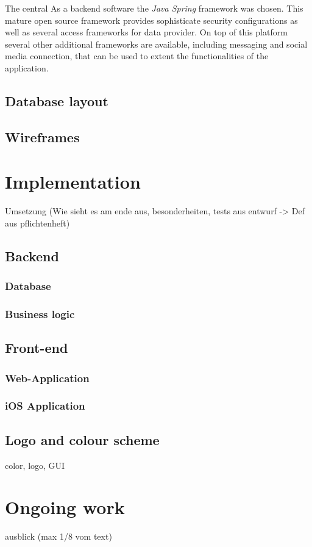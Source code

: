 The central As a backend software the \emph{Java Spring} framework was chosen. This mature open source framework provides sophisticate security configurations as well as several access frameworks for data provider. On top of this platform several other additional frameworks are available, including messaging and social media connection, that can be used to extent the functionalities of the application.



\section{Database layout}

\section{Wireframes}
\label{sec:Wireframes}

\chapter{Implementation}
Umsetzung (Wie sieht es am ende aus, besonderheiten, tests aus entwurf -> Def aus pflichtenheft)

\section{Backend}
\subsection{Database}
\subsection{Business logic}

\section{Front-end}
\subsection{Web-Application}
\subsection{iOS Application}

\section{Logo and colour scheme}
\label{sec:GUI}
color, logo, GUI

\chapter{Ongoing work}
\label{chapter:OngoingWork}
ausblick (max 1/8 vom text)

